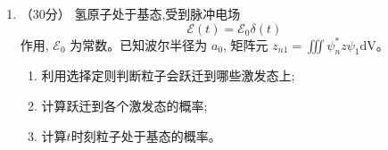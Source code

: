 \begin{enumerate}
{\begin{enumerate}
		\item 对两个全同自旋 $1/2$ 费米子，基态能量为
		\[
			E_{\rm g}=2\varepsilon_1,
		\]
		唯一允许态是
		\[
			\boxed{\phi_1(x_1)\phi_1(x_2)\chi_{00}},
		\]
		其中 $\chi_{00}$ 为自旋单态，故简并度为 $1$。

		第一激发能量为
		\[
			E_{\rm e}=\varepsilon_1+\varepsilon_2=5\varepsilon_1.
		\]
		其全部四个态为
		\[
			\boxed{\frac{\phi_1(x_1)\phi_2(x_2)+\phi_2(x_1)\phi_1(x_2)}
			{\sqrt2}\chi_{00}},
		\]
		以及
		\[
			\boxed{\frac{\phi_1(x_1)\phi_2(x_2)-\phi_2(x_1)\phi_1(x_2)}
			{\sqrt2}\chi_{1m}},\qquad m=1,0,-1.
		\]
		所以第一激发态简并度为 $4$。

		\item 对两个自旋为 $0$ 的全同玻色子，没有额外的自旋简并，空间波函数必须对称。
基态为两个粒子均占据单粒子基态：
\[
\boxed{\Psi_{\rm g}^{\rm B}(x_1,x_2)=\phi_1(x_1)\phi_1(x_2)},
\qquad E_{\rm g}=2\varepsilon_1,\qquad \boxed{g_{\rm g}=1}.
\]
第一激发态为一个粒子占据 $n=1$、另一个占据 $n=2$ 的对称组合：
\[
\boxed{\Psi_{\rm e}^{\rm B}(x_1,x_2)=
\frac{\phi_1(x_1)\phi_2(x_2)+\phi_2(x_1)\phi_1(x_2)}{\sqrt2}}.
\]
由单粒子态的正交归一性，上式已归一化；交换粒子标签不产生新的独立态。
因此
\[
E_{\rm e}=\varepsilon_1+\varepsilon_2=5\varepsilon_1,
\qquad \boxed{g_{\rm e}=1}.
\]
\end{enumerate}
}



\item 
（30分）
氢原子处于基态,受到脉冲电场
$$
\mathscr{E}(t)=\mathscr{E}_{0} \delta(t)
$$
作用, $\mathscr{E}_{0}$ 为常数。已知波尔半径为 $a_{0}$, 矩阵元 $z_{n 1}=\iiint \psi_{n}^{*} z \psi_{1} \mathrm{dV}$。
\begin{enumerate}
	\item
利用选择定则判断粒子会跃迁到哪些激发态上;
	
	
	\item
	计算跃迁到各个激发态的概率;
	
	
	\item
	计算$ t $时刻粒子处于基态的概率。
	
	
	
	
	
	
\end{enumerate}


\end{enumerate}
